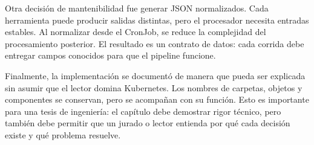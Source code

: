 Otra decisión de mantenibilidad fue generar JSON normalizados. Cada herramienta puede producir salidas distintas, pero el procesador necesita entradas estables. Al normalizar desde el CronJob, se reduce la complejidad del procesamiento posterior. El resultado es un contrato de datos: cada corrida debe entregar campos conocidos para que el pipeline funcione.

Finalmente, la implementación se documentó de manera que pueda ser explicada sin asumir que el lector domina Kubernetes. Los nombres de carpetas, objetos y componentes se conservan, pero se acompañan con su función. Esto es importante para una tesis de ingeniería: el capítulo debe demostrar rigor técnico, pero también debe permitir que un jurado o lector entienda por qué cada decisión existe y qué problema resuelve.
